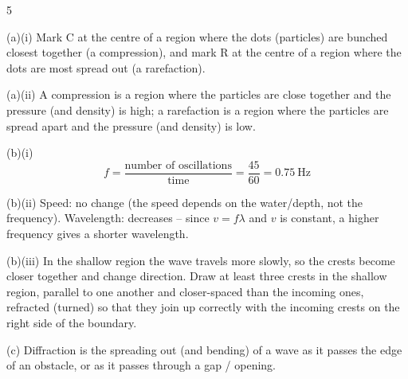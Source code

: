 \begin{question}{5}
\markscheme
{}
\endms

\exemplar
(a)(i) Mark C at the centre of a region where the dots (particles) are bunched closest together (a compression), and mark R at the centre of a region where the dots are most spread out (a rarefaction).

(a)(ii) A compression is a region where the particles are close together and the pressure (and density) is high; a rarefaction is a region where the particles are spread apart and the pressure (and density) is low.

(b)(i) $$ f = \frac{\text{number of oscillations}}{\text{time}} = \frac{45}{60} = 0.75\ \text{Hz} $$

(b)(ii) Speed: no change (the speed depends on the water/depth, not the frequency). Wavelength: decreases -- since $v = f\lambda$ and $v$ is constant, a higher frequency gives a shorter wavelength.

(b)(iii) In the shallow region the wave travels more slowly, so the crests become closer together and change direction. Draw at least three crests in the shallow region, parallel to one another and closer-spaced than the incoming ones, refracted (turned) so that they join up correctly with the incoming crests on the right side of the boundary.

(c) Diffraction is the spreading out (and bending) of a wave as it passes the edge of an obstacle, or as it passes through a gap / opening.
\endexemplar
\end{question}

